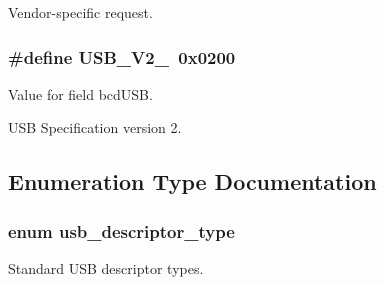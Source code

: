 \-Vendor-\/specific request. 

\hypertarget{group__usb__protocol__group_ga9bccec980a4f41a481b389b4f0c9c690}{
\subsubsection[{\-U\-S\-B\-\_\-\-V2\-\_\-0}]{\setlength{\rightskip}{0pt plus 5cm}\#define \-U\-S\-B\-\_\-\-V2\-\_~0x0200}}
\label{group__usb__protocol__group_ga9bccec980a4f41a481b389b4f0c9c690}


\-Value for field bcd\-U\-S\-B. 

\-U\-S\-B \-Specification version 2. 

\subsection{\-Enumeration \-Type \-Documentation}
\hypertarget{group__usb__protocol__group_ga87d46dd117d939964c939f1518dec93f}{
\subsubsection[{usb\-\_\-descriptor\-\_\-type}]{\setlength{\rightskip}{0pt plus 5cm}enum {\bf usb\-\_\-descriptor\-\_\-type}}}
\label{group__usb__protocol__group_ga87d46dd117d939964c939f1518dec93f}


\-Standard \-U\-S\-B descriptor types. 

